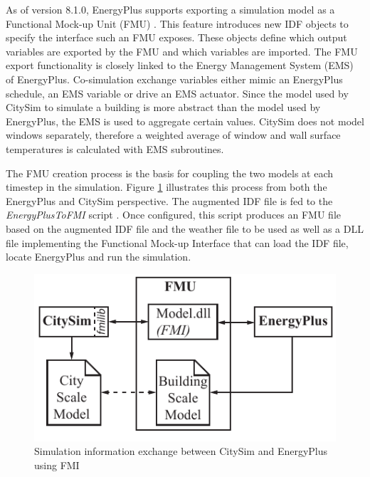 \documentclass{tBPS2e}
\theoremstyle{plain}
\theoremstyle{definition}
\theoremstyle{remark}
\begin{document}
As of version 8.1.0, EnergyPlus supports exporting a simulation model as a Functional Mock-up Unit (FMU) \citep{Nouidui:2014hq,Anonymous:ZZTfF80-}. This feature introduces new IDF objects to specify the interface such an FMU exposes. These objects define which output variables are exported by the FMU and which variables are imported. The FMU export functionality is closely linked to the Energy Management System (EMS) of EnergyPlus. Co-simulation exchange variables either mimic an EnergyPlus schedule, an EMS variable or drive an EMS actuator. Since the model used by CitySim to simulate a building is more abstract than the model used by EnergyPlus, the EMS is used to aggregate certain values. CitySim does not model windows separately, therefore a weighted average of window and wall surface temperatures is calculated with EMS subroutines.



The FMU creation process is the basis for coupling the two models at each timestep in the simulation. Figure \ref{fig:FMUOverview} illustrates this process from both the EnergyPlus and CitySim perspective. The augmented IDF file is fed to the \emph{EnergyPlusToFMI} script \citep{Nouidui:2014bo}. Once configured, this script produces an FMU file based on the augmented IDF file and the weather file to be used as well as a DLL file implementing the Functional Mock-up Interface that can load the IDF file, locate EnergyPlus and run the simulation. 

\begin{figure}[H]
\centering
\includegraphics[scale=0.7]{figures/UMEM_FMU_Overview}
\caption{Simulation information exchange between CitySim and EnergyPlus using FMI \citep{thomas2014multiscale}}
\label{fig:FMUOverview}
\end{figure}
\end{document}
